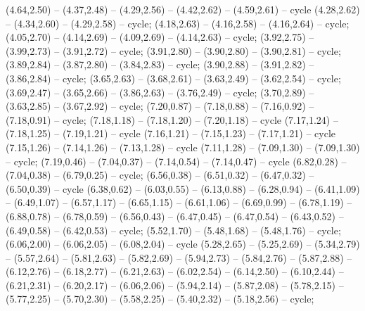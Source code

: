 { (4.64,2.50) -- (4.37,2.48) -- (4.29,2.56) -- (4.42,2.62) -- (4.59,2.61) -- cycle (4.28,2.62) -- (4.34,2.60) -- (4.29,2.58) -- cycle;
 (4.18,2.63) -- (4.16,2.58) -- (4.16,2.64) -- cycle;
 (4.05,2.70) -- (4.14,2.69) -- (4.09,2.69) -- (4.14,2.63) -- cycle;
 (3.92,2.75) -- (3.99,2.73) -- (3.91,2.72) -- cycle;
 (3.91,2.80) -- (3.90,2.80) -- (3.90,2.81) -- cycle;
 (3.89,2.84) -- (3.87,2.80) -- (3.84,2.83) -- cycle;
 (3.90,2.88) -- (3.91,2.82) -- (3.86,2.84) -- cycle;
 (3.65,2.63) -- (3.68,2.61) -- (3.63,2.49) -- (3.62,2.54) -- cycle;
 (3.69,2.47) -- (3.65,2.66) -- (3.86,2.63) -- (3.76,2.49) -- cycle;
 (3.70,2.89) -- (3.63,2.85) -- (3.67,2.92) -- cycle;
 (7.20,0.87) -- (7.18,0.88) -- (7.16,0.92) -- (7.18,0.91) -- cycle;
 (7.18,1.18) -- (7.18,1.20) -- (7.20,1.18) -- cycle (7.17,1.24) -- (7.18,1.25) -- (7.19,1.21) -- cycle (7.16,1.21) -- (7.15,1.23) -- (7.17,1.21) -- cycle (7.15,1.26) -- (7.14,1.26) -- (7.13,1.28) -- cycle (7.11,1.28) -- (7.09,1.30) -- (7.09,1.30) -- cycle;
 (7.19,0.46) -- (7.04,0.37) -- (7.14,0.54) -- (7.14,0.47) -- cycle (6.82,0.28) -- (7.04,0.38) -- (6.79,0.25) -- cycle;
 (6.56,0.38) -- (6.51,0.32) -- (6.47,0.32) -- (6.50,0.39) -- cycle (6.38,0.62) -- (6.03,0.55) -- (6.13,0.88) -- (6.28,0.94) -- (6.41,1.09) -- (6.49,1.07) -- (6.57,1.17) -- (6.65,1.15) -- (6.61,1.06) -- (6.69,0.99) -- (6.78,1.19) -- (6.88,0.78) -- (6.78,0.59) -- (6.56,0.43) -- (6.47,0.45) -- (6.47,0.54) -- (6.43,0.52) -- (6.49,0.58) -- (6.42,0.53) -- cycle;
 (5.52,1.70) -- (5.48,1.68) -- (5.48,1.76) -- cycle;
 (6.06,2.00) -- (6.06,2.05) -- (6.08,2.04) -- cycle (5.28,2.65) -- (5.25,2.69) -- (5.34,2.79) -- (5.57,2.64) -- (5.81,2.63) -- (5.82,2.69) -- (5.94,2.73) -- (5.84,2.76) -- (5.87,2.88) -- (6.12,2.76) -- (6.18,2.77) -- (6.21,2.63) -- (6.02,2.54) -- (6.14,2.50) -- (6.10,2.44) -- (6.21,2.31) -- (6.20,2.17) -- (6.06,2.06) -- (5.94,2.14) -- (5.87,2.08) -- (5.78,2.15) -- (5.77,2.25) -- (5.70,2.30) -- (5.58,2.25) -- (5.40,2.32) -- (5.18,2.56) -- cycle;
}
